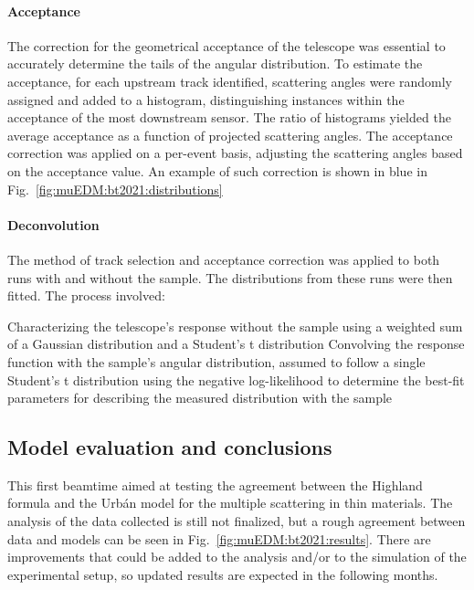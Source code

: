 \begin{refsection}
        \paragraph{Acceptance}
        The correction for the geometrical acceptance of the telescope was essential to accurately determine the tails of the angular distribution.
        To estimate the acceptance, for each upstream track identified, scattering angles were randomly assigned and added to a histogram, distinguishing instances within the acceptance of the most downstream sensor. 
        The ratio of histograms yielded the average acceptance as a function of projected scattering angles. 
        The acceptance correction was applied on a per-event basis, adjusting the scattering angles based on the acceptance value. 
        An example of such correction is shown in blue in Fig.~\ref{fig:muEDM:bt2021:distributions}
        
        \paragraph{Deconvolution}
        The method of track selection and acceptance correction was applied to both runs with and without the sample. 
        The distributions from these runs were then fitted.
        The process involved:
        \begin{outline}
            \1 Characterizing the telescope's response without the sample using a weighted sum of a Gaussian distribution and a Student's t distribution
            \1 Convolving the response function with the sample's angular distribution, assumed to follow a single Student's t distribution
            \1 using the negative log-likelihood to determine the best-fit parameters for describing the measured distribution with the sample
        \end{outline}
    
    \subsection{Model evaluation and conclusions}
        This first beamtime aimed at testing the agreement between the Highland formula and the \gf Urb\'{a}n model for the multiple scattering in thin materials.
        The analysis of the data collected is still not finalized, but a rough agreement between data and models can be seen in Fig.~\ref{fig:muEDM:bt2021:results}.
        There are improvements that could be added to the analysis and/or to the simulation of the experimental setup, so updated results are expected in the following months.
        

\end{refsection}
